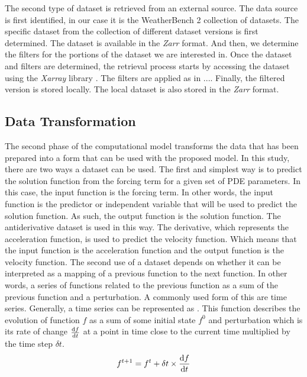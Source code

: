 The second type of dataset is retrieved from an external source. The data source is first identified, in our case it is the WeatherBench 2 collection of datasets. The specific dataset from the collection of different dataset versions is first determined. The dataset is available in the \emph{Zarr} format. And then, we determine the filters for the portions of the dataset we are interested in. Once the dataset and filters are determined, the retrieval process starts by accessing the dataset using the \emph{Xarray} library \autocite{hoyer2017xarray,hoyerXarray2024}. The filters are applied as in .... %
Finally, the filtered version is stored locally. The local dataset is also stored in the \emph{Zarr} format.

\subsection{Data Transformation}
\noindent The second phase of the computational model transforms the data that has been prepared into a form that can be used with the proposed model. In this study, there are two ways a dataset can be used. The first and simplest way is to predict the solution function from the forcing term for a given set of PDE parameters. In this case, the input function is the forcing term. In other words, the input function is the predictor or independent variable that will be used to predict the solution function. As such, the output function is the solution function. The antiderivative dataset is used in this way. The derivative, which represents the acceleration function, is used to predict the velocity function. Which means that the input function is the acceleration function and the output function is the velocity function. The second use of a dataset depends on whether it can be interpreted as a mapping of a previous function to the next function. In other words, a series of functions related to the previous function as a sum of the previous function and a perturbation. A commonly used form of this are time series. Generally, a time series can be represented as . This function describes the evolution of function \(f\) as a sum of some initial state \(f^0\) and perturbation which is its rate of change \(\dv{f}{t}\) at a point in time close to the current time multiplied by the time step \(\delta t\).
\begin{equation}
  f^{t+1} = f^{t} + \delta t \times \dv{f}{t} \label{eq:time_step_function}
\end{equation}
